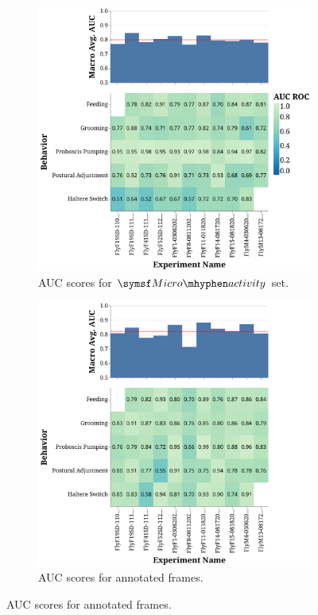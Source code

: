 \begin{figure}[ht!]
	\centering
	\begin{subfigure}[ht!]{0.495\linewidth}
		\centering\includegraphics[width=\linewidth]{figures/AUC_ROC-DActfiltered.pdf}
		\caption{AUC scores for $\MicroActivity$ set. \label{figure:AUC-ROC-Act}}
	\end{subfigure}%
	\hfill
	\begin{subfigure}[ht!]{0.495\linewidth}
		\centering\includegraphics[width=\linewidth]{figures/AUC_ROC-DAnnfiltered.pdf}
		\caption{AUC scores for annotated frames. \label{figure:AUC-ROC-Ann}}
	\end{subfigure}%


\end{figure}
